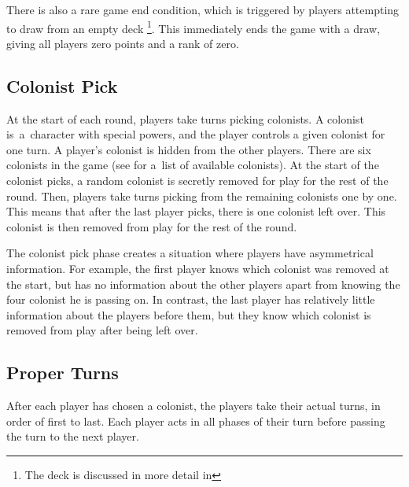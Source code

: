 There is also a rare game end condition, which is triggered by players attempting to
draw from an empty deck
\footnote{The deck is discussed in more detail in }.
This immediately ends the game with a draw, giving all
players zero points and a rank of zero.

\subsection{Colonist Pick}

At the start of each round, players take turns picking colonists. A colonist is~a~character
with special powers, and the player controls a given colonist for one turn. A player's
colonist is hidden from the other players.
There are six colonists in the game (see  for a~list
of available colonists). At the start of the colonist picks, a random colonist is
secretly removed for play for the rest of the round. Then, players take turns
picking from the remaining colonists one by one. This means that after the last
player picks, there is one colonist left over. This colonist is then removed from
play for the rest of the round.

The colonist pick phase creates a situation where players have asymmetrical information.
For example, the first player knows which colonist was removed at the start, but has
no information about the other players apart from knowing the four colonist he is passing
on. In contrast, the last player has relatively little information about the players
before them, but they know which colonist is removed from play after being left over.

\subsection{Proper Turns}

After each player has chosen a colonist, the players take their actual turns, in order
of first to last. Each player acts in all phases of their turn before passing the turn
to the next player.

